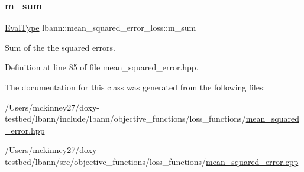 \subsubsection{\texorpdfstring{m\+\_\+sum}{m\_sum}}
{\footnotesize\ttfamily \hyperlink{base_8hpp_a3266f5ac18504bbadea983c109566867}{Eval\+Type} lbann\+::mean\+\_\+squared\+\_\+error\+\_\+loss\+::m\+\_\+sum\hspace{0.3cm}{\ttfamily [private]}}

Sum of the the squared errors. 

Definition at line 85 of file mean\+\_\+squared\+\_\+error.\+hpp.



The documentation for this class was generated from the following files\+:\begin{DoxyCompactItemize}
\item 
/\+Users/mckinney27/doxy-\/testbed/lbann/include/lbann/objective\+\_\+functions/loss\+\_\+functions/\hyperlink{objective__functions_2loss__functions_2mean__squared__error_8hpp}{mean\+\_\+squared\+\_\+error.\+hpp}\item 
/\+Users/mckinney27/doxy-\/testbed/lbann/src/objective\+\_\+functions/loss\+\_\+functions/\hyperlink{objective__functions_2loss__functions_2mean__squared__error_8cpp}{mean\+\_\+squared\+\_\+error.\+cpp}\end{DoxyCompactItemize}
